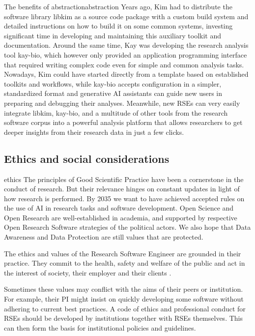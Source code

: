 \documentclass{eceasst}
\begin{document}
\begin{story}{The benefits of abstraction}{abstraction}
Years ago, Kim had to distribute the software library libkim as a source code package with a custom build system and detailed instructions on how to build it on some common systems,
investing significant time in developing and maintaining this auxiliary toolkit and documentation.
Around the same time, Kay was developing the research analysis tool kay-bio,
which however only provided an application programming interface that
required writing complex code even for simple and common analysis tasks.
Nowadays, Kim could have started directly from a template based on established toolkits and workflows,
while kay-bio accepts configuration in a simpler, standardized format and generative AI assistants
can guide new users in preparing and debugging their analyses.
Meanwhile, new RSEs can very easily integrate libkim, kay-bio, and a multitude
of other tools from the research software corpus into a powerful analysis
platform that allows researchers to get deeper insights from their research data
in just a few clicks.
\end{story}

\subsection{Ethics and social considerations}
\begin{whatis}{}{ethics}
The principles of Good Scientific Practice \cite{dfg_gsp} have been a cornerstone in the conduct of research.
But their relevance hinges on constant updates in light of how research is performed.
By 2035 we want to have achieved accepted rules on the use of AI in research tasks and software development.
Open Science and Open Research are well-established in academia, and supported by respective Open Research Software
strategies of the political actors. We also hope that Data Awareness and Data Protection are still values
that are protected.
\end{whatis}

The ethics and values of the Research Software Engineer are grounded in their practice.
They commit to the health, safety and welfare of the public and act in the interest of society, their employer and their clients \cite{Goth2024}.

Sometimes these values may conflict with the aims of their peers or institution. For example, their PI might insist on quickly developing some software without adhering to current best practices.
A code of ethics and professional conduct for RSEs should be developed by institutions together with RSEs themselves.
This can then form the basis for institutional policies and guidelines.
\end{document}
